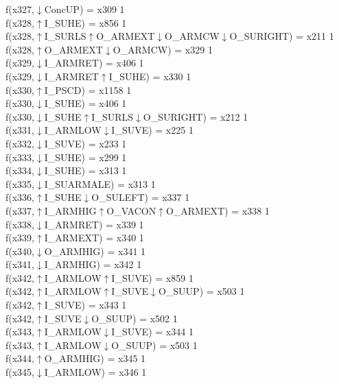 f(x327,$\downarrow$ConcUP) = x309 {1} \\
f(x328,$\uparrow$I\_SUHE) = x856 {1} \\
f(x328,$\uparrow$I\_SURLS$\uparrow$O\_ARMEXT$\downarrow$O\_ARMCW$\downarrow$O\_SURIGHT) = x211 {1} \\
f(x328,$\uparrow$O\_ARMEXT$\downarrow$O\_ARMCW) = x329 {1} \\
f(x329,$\downarrow$I\_ARMRET) = x406 {1} \\
f(x329,$\downarrow$I\_ARMRET$\uparrow$I\_SUHE) = x330 {1} \\
f(x330,$\uparrow$I\_PSCD) = x1158 {1} \\
f(x330,$\downarrow$I\_SUHE) = x406 {1} \\
f(x330,$\downarrow$I\_SUHE$\uparrow$I\_SURLS$\downarrow$O\_SURIGHT) = x212 {1} \\
f(x331,$\downarrow$I\_ARMLOW$\downarrow$I\_SUVE) = x225 {1} \\
f(x332,$\downarrow$I\_SUVE) = x233 {1} \\
f(x333,$\downarrow$I\_SUHE) = x299 {1} \\
f(x334,$\downarrow$I\_SUHE) = x313 {1} \\
f(x335,$\downarrow$I\_SUARMALE) = x313 {1} \\
f(x336,$\uparrow$I\_SUHE$\downarrow$O\_SULEFT) = x337 {1} \\
f(x337,$\uparrow$I\_ARMHIG$\uparrow$O\_VACON$\uparrow$O\_ARMEXT) = x338 {1} \\
f(x338,$\downarrow$I\_ARMRET) = x339 {1} \\
f(x339,$\uparrow$I\_ARMEXT) = x340 {1} \\
f(x340,$\downarrow$O\_ARMHIG) = x341 {1} \\
f(x341,$\downarrow$I\_ARMHIG) = x342 {1} \\
f(x342,$\uparrow$I\_ARMLOW$\uparrow$I\_SUVE) = x859 {1} \\
f(x342,$\uparrow$I\_ARMLOW$\uparrow$I\_SUVE$\downarrow$O\_SUUP) = x503 {1} \\
f(x342,$\uparrow$I\_SUVE) = x343 {1} \\
f(x342,$\uparrow$I\_SUVE$\downarrow$O\_SUUP) = x502 {1} \\
f(x343,$\uparrow$I\_ARMLOW$\downarrow$I\_SUVE) = x344 {1} \\
f(x343,$\uparrow$I\_ARMLOW$\downarrow$O\_SUUP) = x503 {1} \\
f(x344,$\uparrow$O\_ARMHIG) = x345 {1} \\
f(x345,$\downarrow$I\_ARMLOW) = x346 {1} \\
